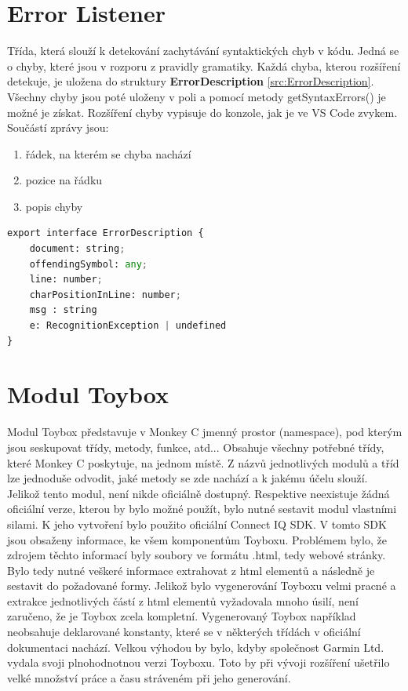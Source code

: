 \section{Error Listener} \label{errorListener}
Třída, která slouží k detekování zachytávání syntaktických chyb v kódu. Jedná se o chyby, které jsou v rozporu z pravidly gramatiky. Každá chyba, kterou rozšíření detekuje, je uložena do struktury \textbf{ErrorDescription} \ref{src:ErrorDescription}. Všechny chyby jsou poté uloženy v poli a pomocí metody getSyntaxErrors() je možné je získat. Rozšíření chyby vypisuje do konzole, jak je ve VS Code zvykem. Součástí zprávy jsou:
\begin{enumerate}
\item řádek, na kterém se chyba nachází
\item pozice na řádku
\item popis chyby
\end{enumerate}

\begin{lstlisting}[language=Python,label=src:ErrorDescription,caption={rozhraní pro popis chyby}]
export interface ErrorDescription {
	document: string;
	offendingSymbol: any;
	line: number;
	charPositionInLine: number;
	msg : string
	e: RecognitionException | undefined
}
\end{lstlisting}

\section{Modul Toybox}
Modul Toybox představuje v Monkey C jmenný prostor (namespace), pod kterým jsou seskupovat třídy, metody, funkce, atd... Obsahuje všechny potřebné třídy, které Monkey C poskytuje, na jednom místě. Z názvů jednotlivých modulů a tříd lze jednoduše odvodit, jaké metody se zde nachází a k jakému účelu slouží.\\ 
Jelikož tento modul, není nikde oficiálně dostupný. Respektive neexistuje žádná oficiální verze, kterou by bylo možné použít, bylo nutné sestavit modul vlastními silami. K jeho vytvoření bylo použito oficiální Connect IQ SDK. V tomto SDK jsou obsaženy informace, ke všem komponentům Toyboxu. Problémem bylo, že zdrojem těchto informací byly soubory ve formátu .html, tedy webové stránky. Bylo tedy nutné veškeré informace extrahovat z html elementů a následně je sestavit do požadované formy. Jelikož bylo vygenerování Toyboxu velmi pracné a extrakce jednotlivých částí z html elementů vyžadovala mnoho úsilí, není zaručeno, že je Toybox zcela kompletní. Vygenerovaný Toybox například neobsahuje deklarované konstanty, které se v některých třídách v oficiální dokumentaci nachází. Velkou výhodou by bylo, kdyby společnost Garmin Ltd. \cite{GARMIN_OFFICIAL} vydala svoji plnohodnotnou verzi Toyboxu. Toto by při vývoji rozšíření ušetřilo velké množství práce a času stráveném při jeho generování.

